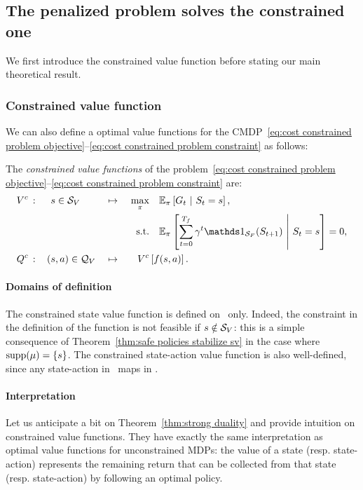 \subsection{The penalized problem solves the constrained one}
We first introduce the constrained value function before stating our main theoretical result.

\subsubsection{Constrained value function}
We can also define a optimal value functions for the CMDP~\eqref{eq:cost constrained problem objective}--\eqref{eq:cost constrained problem constraint} as follows:
\begin{definition}
	The\emph{ constrained value functions} of the problem~\eqref{eq:cost constrained problem objective}--\eqref{eq:cost constrained problem constraint} are:
	\begin{alignat}{7}
	V^c\,&:&\, &s\in\SV& &\mapsto&~\max_\pi & \quad\expected_\pi\left[G_t~\middle|~S_t = s\right], \label{eq:constrained state value}\\
	& & & & & &\mathrm{s.t.} & \quad \expected_\pi\left[\sum_{t=0}^\Tf\gamma^t\indicator_\SF(S_{t+1})~\middle|~S_t = s\right] = 0, \label{eq:constrained state value constraint}\\
	Q^c\,&:&\,(&s, a)\in\QV& &\mapsto& V^c&\left[f(s, a)\right]. \label{eq:constrained stateaction value}
	\end{alignat}
\end{definition}
\paragraph{Domains of definition} The constrained state value function is defined on \SV~only. Indeed, the constraint in the definition of the function is not feasible if $s\notin{\ensuremath{\mathcal{S}}_{V}}$: this is a simple consequence of Theorem~\ref{thm:safe policies stabilize sv} in the case where $\operatorname{supp}(\mu) = \{s\}$. The constrained state-action value function is also well-defined, since any state-action in \QV~maps in \SV.
\paragraph{Interpretation} Let us anticipate a bit on Theorem~\ref{thm:strong duality} and provide intuition on constrained value functions. They have exactly the same interpretation as optimal value functions for unconstrained MDPs: the value of a state (resp. state-action) represents the remaining return that can be collected from that state (resp. state-action) by following an optimal policy. 

